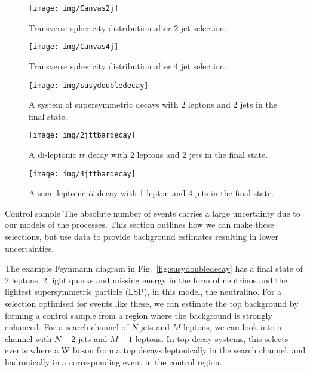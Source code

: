 \documentclass[final]{beamer} %
\begin{document}
\begin{frame}[t]
\begin{columns}[t]
  \begin{column}{0.60\paperwidth}
    \begin{figure}\centering
     \begin{minipage}[c]{.45\textwidth}\centering
      \texttt{[image: img/Canvas2j]}
      \caption{Transverse sphericity distribution after 2 jet selection.}
      \label{fig:Canvas2j}
     \end{minipage}\hfill
     \begin{minipage}[c]{.45\textwidth}\centering
      \texttt{[image: img/Canvas4j]}
      \caption{Transverse sphericity distribution after 4 jet selection.}
      \label{fig:Canvas4j}
     \end{minipage}
    \end{figure}
   \begin{figure}\centering
    \begin{minipage}[c]{.3\textwidth}\centering\vfill
     \texttt{[image: img/susydoubledecay]}
     \caption{A system of supersymmetric decays with 2 leptons and 2 jets in
     the final state.}
     \label{fig:susydoubledecay}
    \end{minipage}
    \begin{minipage}[c]{.3\textwidth}\centering\vfill
     \texttt{[image: img/2jttbardecay]}
     \caption{A di-leptonic $t\bar{t}$ decay with 2 leptons and 2 jets in the
     final state.}
     \label{fig:2jttbardecay}
    \end{minipage}
    \begin{minipage}[c]{.3\textwidth}\centering\vfill
     \texttt{[image: img/4jttbardecay]}
     \caption{A semi-leptonic $t\bar{t}$ decay with 1 lepton and 4 jets in the
     final state.}
     \label{fig:4jttbardecay}
    \end{minipage}
   \end{figure}
   \begin{block}{Control sample}
   The absolute number of events carries a large uncertainty due to our models
   of the processes. This section outlines how we can make these selections, but
   use data to provide background estimates resulting in lower
   uncertainties.
   
   The example Feynmann diagram in Fig.~\ref{fig:susydoubledecay} has a final
   state of 2 leptons, 2 light quarks and missing energy in the form of
   neutrinos and the lightest supersymmetric particle (LSP), in this model, the
   neutralino. For a selection optimised for events like these, we can estimate
   the top background by forming a control sample from a region where the
   background is strongly enhanced. For a search channel of $N$ jets and $M$
   leptons, we can look into a channel with $N+2$ jets and $M-1$ leptons. In top
   decay systems, this selects events where a W boson from a top decays
   leptonically in the search channel, and hadronically in a corresponding event
   in the control region.
   

\end{block}
\end{column}
\end{columns}
\end{frame}
\end{document}
